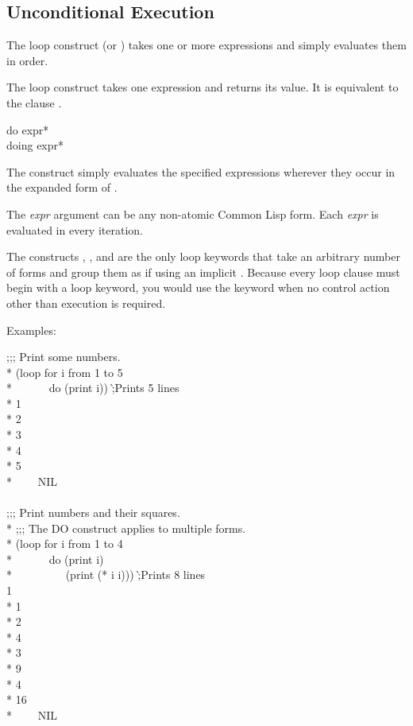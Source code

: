 \begin{new}
\section{Unconditional Execution}
\label{LOOP-UNCOND-SECTION}


The loop construct  (or ) takes one or more expressions
and simply evaluates them in order.

The loop construct  takes one expression and returns its value.  It 
is equivalent to the clause .

\begin{defloop}
do {expr}* \\
doing {expr}*

The  construct simply evaluates the specified expressions
wherever they occur in the expanded form of .

The {\it expr\/} argument can be any non-atomic Common Lisp form.
Each {\it expr\/} is evaluated in every iteration.

The constructs , , and  are the
only loop keywords that take an arbitrary number of forms and group
them as if using an implicit .  
Because every loop clause must begin with a loop keyword, you would use
the keyword  when no control action other than execution is 
required.

Examples:
\begin{lisp}
;;; Print some numbers. \\*
(loop for i from 1 to 5 \\*
~~~~~~do (print i)) \`;{\rm Prints 5 lines} \\*
1 \\*
2 \\*
3 \\*
4 \\*
5 \\*
~~~\EV~NIL \\
 \\
;;; Print numbers and their squares. \\*
;;; The DO construct applies to multiple forms. \\*
(loop for i from 1 to 4 \\*
~~~~~~do (print i) \\*
~~~~~~~~~(print (* i i))) \`;{\rm Prints 8 lines} \\
1  \\*
1  \\*
2  \\*
4  \\*
3  \\*
9  \\*
4  \\*
16  \\*
~~~\EV~NIL
\end{lisp}
\end{defloop}



\end{new}
